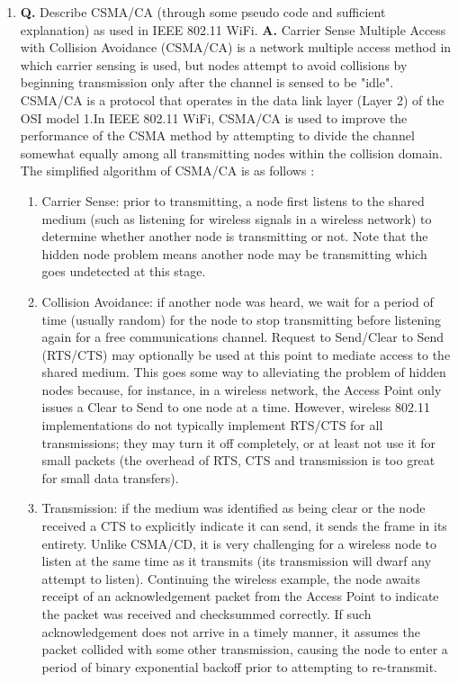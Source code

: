 \documentclass[main.tex]{subfiles}
\begin{document}
\begin{enumerate}
\begin{enumerate}
        \item \textbf{Q.} Describe CSMA/CA (through some pseudo code and sufficient explanation) as used in IEEE 802.11 WiFi. \textbf{A.} Carrier Sense Multiple Access with Collision Avoidance (CSMA/CA) is a network multiple access method in which carrier sensing is used, but nodes attempt to avoid collisions by beginning transmission only after the channel is sensed to be "idle". CSMA/CA is a protocol that operates in the data link layer (Layer 2) of the OSI model 1.In IEEE 802.11 WiFi, CSMA/CA is used to improve the performance of the CSMA method by attempting to divide the channel somewhat equally among all transmitting nodes within the collision domain. The simplified algorithm of CSMA/CA is as follows :
        \begin{enumerate}
            \item Carrier Sense: prior to transmitting, a node first listens to the shared medium (such as listening for wireless signals in a wireless network) to determine whether another node is transmitting or not. Note that the hidden node problem means another node may be transmitting which goes undetected at this stage.
            \item Collision Avoidance: if another node was heard, we wait for a period of time (usually random) for the node to stop transmitting before listening again for a free communications channel. Request to Send/Clear to Send (RTS/CTS) may optionally be used at this point to mediate access to the shared medium. This goes some way to alleviating the problem of hidden nodes because, for instance, in a wireless network, the Access Point only issues a Clear to Send to one node at a time. However, wireless 802.11 implementations do not typically implement RTS/CTS for all transmissions; they may turn it off completely, or at least not use it for small packets (the overhead of RTS, CTS and transmission is too great for small data transfers).
            \item Transmission: if the medium was identified as being clear or the node received a CTS to explicitly indicate it can send, it sends the frame in its entirety. Unlike CSMA/CD, it is very challenging for a wireless node to listen at the same time as it transmits (its transmission will dwarf any attempt to listen). Continuing the wireless example, the node awaits receipt of an acknowledgement packet from the Access Point to indicate the packet was received and checksummed correctly. If such acknowledgement does not arrive in a timely manner, it assumes the packet collided with some other transmission, causing the node to enter a period of binary exponential backoff prior to attempting to re-transmit.
        \end{enumerate}


\end{enumerate}
\end{enumerate}
\end{document}
